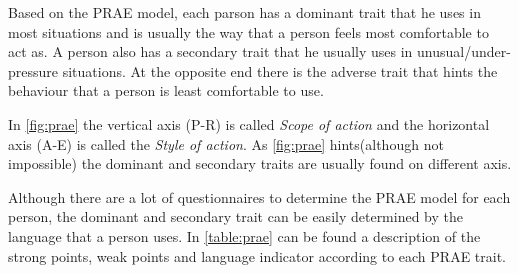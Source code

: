 Based on the PRAE model, each parson has a dominant trait that he uses in most situations and is usually the way that a person feels most comfortable to act as. A person also has a secondary trait that he usually uses in unusual/under-pressure situations. At the opposite end there is the adverse trait that hints the behaviour that a person is least comfortable to use.

In \ref{fig:prae} the vertical axis (P-R) is called \textit{Scope of action} and the horizontal axis (A-E) is called the \textit{Style of action}. As \ref{fig:prae} hints(although not impossible) the dominant and secondary traits are usually found on different axis. 

Although there are a lot of questionnaires to determine the PRAE model for each person, the dominant and secondary trait can be easily determined by the language that a person uses. In \ref{table:prae} can be found a description of the strong points, weak points and language indicator according to each PRAE trait.

